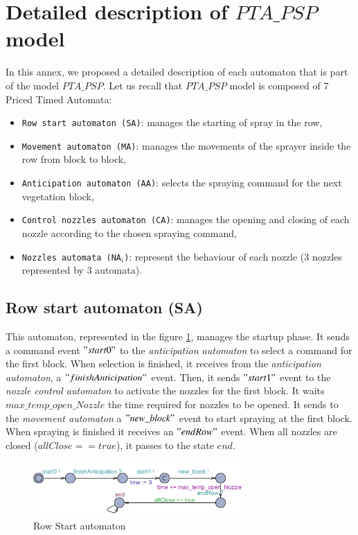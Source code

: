 \newpage

\section{Detailed description of $PTA\_PSP$ model}
\label{AnnexeModeles}
In this annex, we proposed a detailed description of each automaton that is part of the model $PTA\_PSP$. Let us recall that $PTA\_PSP$ model is composed of 7 Priced Timed Automata:
\begin{itemize}
    \item \texttt{Row start automaton (SA)}: manages the starting of spray in the row,
    \item \texttt{Movement automaton (MA)}: manages the movements of the sprayer inside the row from block to block,
    \item \texttt{Anticipation automaton (AA)}: selects the spraying command for the next vegetation block,
    \item \texttt{Control nozzles automaton (CA)}: manages the opening and closing of each nozzle according to the chosen spraying command,
    \item \texttt{Nozzles automata (NA$_i$)}: represent the behaviour of each nozzle (3 nozzles represented by 3 automata).
\end{itemize}

\subsection{\textbf{Row start automaton (SA)}}
This automaton, represented in the figure \ref{fig:start}, manages the startup phase. It sends a command event $"start0"$ to the \textit{anticipation automaton} to select a command for the first block. When selection is finished, it receives from the \textit{anticipation automaton}, a $"finishAnticipation"$ event. Then, it sends $"start1"$ event to the \textit{nozzle control automaton} to activate the nozzles for the first block. It waits $max\_temp\_open\_Nozzle$ the time required for nozzles to be opened. It sends to the \textit{movement automaton} a $"new \_block" $ event to start spraying at the first block. When spraying is finished it receives an $"endRow"$ event. When all nozzles are closed ($allClose == true$), it passes to the state $end$.

    \begin{figure} [h!]
\begin{center}
\includegraphics[width = 8cm]{Vegetation.pdf}
\caption{Row Start automaton} \label{fig:start}
\end{center}
\end{figure}



